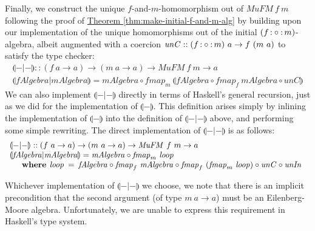 \documentclass{jfp1}
\newcommand{\fold}[1]{\llparenthesis #1 \rrparenthesis}
\newcommand{\eFold}[2]{\llparenthesis #1|#2 \rrparenthesis}
\newcommand{\thmref}[1]{\hyperref[#1]{Theorem \ref*{#1}}}
\newcommand{\kw}[1]{\textbf{#1}}
\begin{document}
Finally, we construct the unique $f$-and-$m$-homomorphism out of
$\mathit{MuFM}~f~m$ following the proof of
\thmref{thm:make-initial-f-and-m-alg} by building upon our
implementation of the unique homomorphisms out of the initial $(f
\mathop{\mathord:\circ\mathord:} m)$-algebra, albeit augmented with a coercion $\mathit{unC}
:: (f \mathop{\mathord:\circ\mathord:} m)~a \to f~(m~a)$ to satisfy the type checker:
\begin{displaymath}
  \begin{array}{l}
    \eFold{-}{-} :: (f~a \to a) \to (m~a \to a) \to \mathit{MuFM}~f~m \to a \\
    \eFold{\mathit{fAlgebra}}{\mathit{mAlgebra}} = \mathit{mAlgebra} \circ \mathit{fmap}_m~\fold{\mathit{fAlgebra} \circ \mathit{fmap}_f~\mathit{mAlgebra} \circ \mathit{unC}}
  \end{array}
\end{displaymath}
We can also implement $\eFold{-}{-}$ directly in terms of Haskell's
general recursion, just as we did for the implementation of
$\fold{-}$. This definition arises simply by inlining the
implementation of $\fold{-}$ into the definition of $\eFold{-}{-}$
above, and performing some simple rewriting. The direct implementation
of $\eFold{-}{-}$ is as follows:
\begin{displaymath}
  \begin{array}{l}
    \eFold{-}{-} :: (f~a \to a) \to (m~a \to a) \to \mathit{MuFM}~f~m \to a \\
    \eFold{\mathit{fAlgebra}}{\mathit{mAlgebra}} = \mathit{mAlgebra} \circ \mathit{fmap}_m~\mathit{loop} \\
    \quad\begin{array}{r@{\hspace{0.4em}}l@{\hspace{0.5em}}c@{\hspace{0.5em}}l}
      \kw{where} & \mathit{loop} &=& \mathit{fAlgebra} \circ \mathit{fmap}_f~\mathit{mAlgebra} \circ \mathit{fmap}_f~(\mathit{fmap}_m~\mathit{loop}) \circ \mathit{unC} \circ \mathit{unIn}
    \end{array}
  \end{array}
\end{displaymath}

Whichever implementation of $\eFold{-}{-}$ we choose, we note that
there is an implicit precondition that the second argument (of type
$m~a \to a$) must be an Eilenberg-Moore algebra. Unfortunately, we are
unable to express this requirement in Haskell's type system. 

\end{document}
